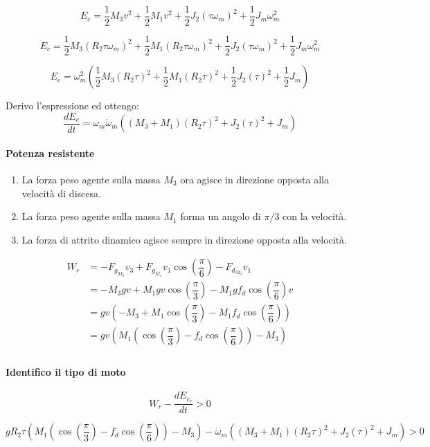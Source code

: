 \documentclass[main.tex]{subfiles}
\begin{document}
\[
	E_c = \dfrac{1}{2}M_3v^2 + \dfrac{1}{2}M_1v^2 + \dfrac{1}{2}J_2(\tau\omega_m)^2 + \dfrac{1}{2}J_m\omega_m^2
\]

\[
	E_c = \dfrac{1}{2}M_3(R_2 \tau \omega_m)^2 + \dfrac{1}{2}M_1(R_2 \tau \omega_m)^2 + \dfrac{1}{2}J_2(\tau\omega_m)^2 + \dfrac{1}{2}J_m\omega_m^2
\]

\[
	E_c = \omega_m^2(\dfrac{1}{2}M_3(R_2 \tau)^2 + \dfrac{1}{2}M_1(R_2 \tau)^2 + \dfrac{1}{2}J_2(\tau)^2 + \dfrac{1}{2}J_m)
\]

Derivo l'espressione ed ottengo:
\[
	\dfrac{dE_c}{dt} = \omega_m\dot{\omega}_m((M_3+M_1)(R_2 \tau)^2 + J_2(\tau)^2 + J_m)
\]

\paragraph{Potenza resistente}

\begin{enumerate}
\item La forza peso agente sulla massa $M_3$ ora agisce in direzione opposta alla velocità di discesa.
\item La forza peso agente sulla massa $M_1$ forma un angolo di $\pi/3$ con la velocità.
\item La forza di attrito dinamico agisce sempre in direzione opposta alla velocità.
\end{enumerate}

\begin{align*}
	W_r &= -F_{g_{M_3}}v_3 + F_{g_{M_1}}v_1\cos\left(\dfrac{\pi}{6} \right ) - F_{d_{M_3}}v_1\\
	&= -M_3gv + M_1 g v\cos\left(\dfrac{\pi}{3} \right ) - M_1g f_d \cos(\dfrac{\pi}{6})v\\
	&= gv(-M_3 + M_1 \cos\left(\dfrac{\pi}{3} \right ) - M_1 f_d \cos(\dfrac{\pi}{6}))\\
	&= gv(M_1(\cos\left(\dfrac{\pi}{3} \right ) -  f_d \cos(\dfrac{\pi}{6}))-M_3)\\
\end{align*}

\paragraph{Identifico il tipo di moto}

\[
	W_r - \dfrac{dE_{c_r}}{dt} > 0
\]

\[
	gR_2 \tau(M_1(\cos\left(\dfrac{\pi}{3} \right ) -  f_d \cos(\dfrac{\pi}{6}))-M_3) - \dot{\omega}_m((M_3+M_1)(R_2 \tau)^2 + J_2(\tau)^2 + J_m) > 0
\]
\end{document}
